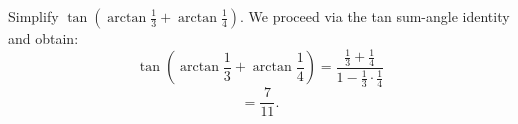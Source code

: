 Simplify $\tan(\arctan \frac{1}{3} + \arctan \frac{1}{4})$.
\newline
We proceed via the tan sum-angle identity and obtain:
\[
\tan\left(\arctan\frac{1}{3}+\arctan\frac{1}{4}\right) = \frac{\frac{1}{3}+\frac{1}{4}}{1-\frac{1}{3}\cdot\frac{1}{4}}
\]
\[
=\frac{7}{11}.
\]